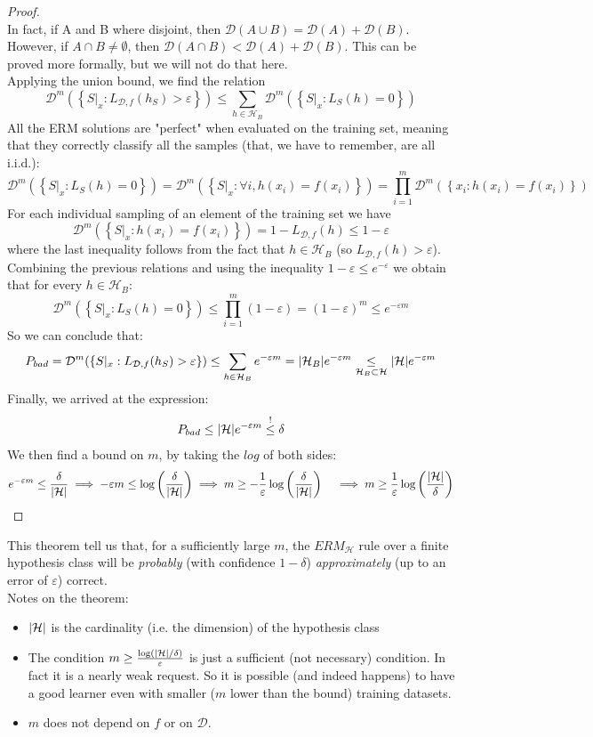 \documentclass[12pt]{report}
\theoremstyle{plain}
\newcommand\mcl[1]{\mathcal{#1}}
\begin{document}
\begin{flushleft}
\begin{proof}
\begin{equation}
	\end{equation}
	In fact, if A and B where disjoint, then $\mcl{D}(A\cup B) = \mcl{D}(A) + \mcl{D}(B)$. However, if $A\cap B\neq\emptyset$, then $\mcl{D}(A\cap B) < \mcl{D}(A) + \mcl{D}(B)$. This can be proved more formally, but we will not do that here.\\
	Applying the union bound, we find the relation
	\[ \mcl{D}^m\left(\left\{ S|_x:L_{\mcl{D},f}(h_S)>\varepsilon \right\}\right)\leq\sum_{h\in\mcl{H}_B}\mcl{D}^m\left(\left\{ S|_x:L_S(h)=0\right\}\right) \]
	All the ERM solutions are "perfect" when evaluated on the training set, meaning that they correctly classify all the samples (that, we have to remember, are all i.i.d.):
	\[ \mcl{D}^m\left(\left\{ S|_x:L_S(h)=0\right\}\right)=\mcl{D}^m\left(\left\{ S|_x:\forall i,h(x_i)=f(x_i)\right\}\right)=\prod_{i=1}^m \mcl{D}^m\left(\left\{ x_i:h(x_i)=f(x_i) \right\}\right) \]
	For each individual sampling of an element of the training set we have
	\[ \mcl{D}^m\left(\left\{ S|_x: h(x_i)=f(x_i)\right\}\right)= 1-L_{\mcl{D},f}(h)\leq 1-\varepsilon \]
	where the last inequality follows from the fact that $h\in\mcl{H}_B$ (so $L_{\mcl{D},f}(h)>\varepsilon$). Combining the previous relations and using the inequality $1-\varepsilon\leq e^{-\varepsilon}$ we obtain that for every $h\in\mcl{H}_B$:
	\[ \mcl{D}^m\left(\left\{ S|_x:L_S(h)=0\right\}\right)\leq\prod_{i=1}^m(1-\varepsilon)=\left(1-\varepsilon\right)^m\leq e^{-\varepsilon m} \]
	So we can conclude that:
	\[ P_{bad}=\mcl{D}^m(\left\{S|_x:L_{\mcl{D},f}(h_S)>\varepsilon\right\})\leq\sum_{h\in\mcl{H}_B}e^{-\varepsilon m}=\abs{\mcl{H}_B}e^{-\varepsilon m}\underset{\mcl{H}_B\subset\mcl{H}}{\leq} \abs{\mcl{H}}e^{-\varepsilon m} \]
	Finally, we arrived at the expression:
	\[ P_{bad} \leq \abs{\mcl{H}}e^{-\varepsilon m}\overset{!}{\leq}\delta \]
	We then find a bound on $m$, by taking the $log$ of both sides:
	\[ e^{-\varepsilon m}\leq\frac{\delta}{\abs{\mcl{H}}} \implies -\varepsilon m\leq\log\left(\frac{\delta}{\abs{\mcl{H}}}\right)\implies m\geq -\frac{1}{\varepsilon}\log\left(\frac{\delta}{\abs{\mcl{H}}}\right) \quad\implies m\geq \frac{1}{\varepsilon}\log\left(\frac{\abs{\mcl{H}}}{\delta}\right)\]
\end{proof} 

This theorem tell us that, for a sufficiently large $m$, the $ERM_\mcl{H}$ rule over a finite hypothesis class will be \textit{probably} (with confidence $1-\delta$) \textit{approximately} (up to an error of $\varepsilon$) correct.\\
Notes on the theorem:
\begin{itemize}
\item $\abs{\mcl{H}}$ is the cardinality (i.e. the dimension) of the hypothesis class
\item The condition $m\geq\frac{\log (\abs{\mcl{H}}/\delta)}{\varepsilon}$ is just a sufficient (not necessary) condition. In fact it is a nearly weak request. So it is possible (and indeed happens) to have a good learner even with smaller ($m$ lower than the bound) training datasets.
\item $m$ does not depend on $f$ or on $\mcl{D}$.
\end{itemize}


\end{flushleft}
\end{document}
